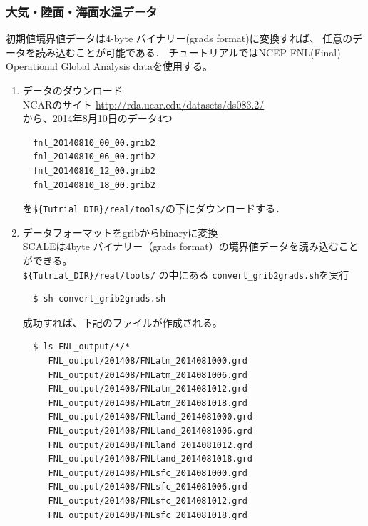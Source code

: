 \subsubsection{大気・陸面・海面水温データ}
初期値境界値データは4-byte バイナリー(grads format)に変換すれば、
任意のデータを読み込むことが可能である．
チュートリアルではNCEP FNL(Final) Operational Global Analysis dataを使用する。
\begin{enumerate}
\item データのダウンロード\\
NCARのサイト
 \url{http://rda.ucar.edu/datasets/ds083.2/}\\
から、2014年8月10日のデータ4つ
\begin{verbatim}
  fnl_20140810_00_00.grib2
  fnl_20140810_06_00.grib2
  fnl_20140810_12_00.grib2
  fnl_20140810_18_00.grib2
\end{verbatim}
を\verb|${Tutrial_DIR}/real/tools/|の下にダウンロードする．

\item データフォーマットをgribからbinaryに変換\\
 SCALEは4byte バイナリー（grads format）の境界値データを読み込むことができる。\\
\verb|${Tutrial_DIR}/real/tools/| の中にある \verb|convert_grib2grads.sh|を実行
\begin{verbatim}
  $ sh convert_grib2grads.sh
\end{verbatim}
成功すれば、下記のファイルが作成される。
\begin{verbatim}
  $ ls FNL_output/*/*
     FNL_output/201408/FNLatm_2014081000.grd
     FNL_output/201408/FNLatm_2014081006.grd
     FNL_output/201408/FNLatm_2014081012.grd
     FNL_output/201408/FNLatm_2014081018.grd
     FNL_output/201408/FNLland_2014081000.grd
     FNL_output/201408/FNLland_2014081006.grd
     FNL_output/201408/FNLland_2014081012.grd
     FNL_output/201408/FNLland_2014081018.grd
     FNL_output/201408/FNLsfc_2014081000.grd
     FNL_output/201408/FNLsfc_2014081006.grd
     FNL_output/201408/FNLsfc_2014081012.grd
     FNL_output/201408/FNLsfc_2014081018.grd
\end{verbatim}
\end{enumerate}

